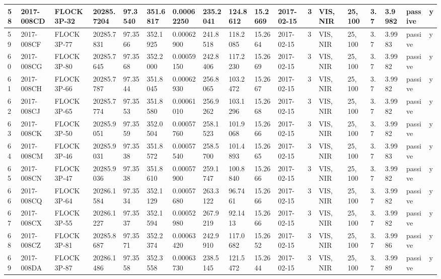 \documentclass[12pt,a4paper,notitlepage,twoside,openright]{report}
\begin{document}
\begin{longtable}{|l|l|l|l|l|l|l|l|l|l|l|l|l|l|l|l|l|l|}
        58 & 2017-008CD & FLOCK 3P-32 & 20285.7204 & 97.3540 & 351.6817 & 0.00062250 & 235.2041 & 124.8612 & 15.2669 & 2017-02-15 & 3 & VIS, NIR & 25, 100 & 3.7 & 3.9982 & passive & y \\ \hline
        59 & 2017-008CF & FLOCK 3P-77 & 20285.7831 & 97.3566 & 352.1925 & 0.00062900 & 241.8518 & 118.2085 & 15.2664 & 2017-02-15 & 3 & VIS, NIR & 25, 100 & 3.7 & 3.9983 & passive & y \\ \hline
        60 & 2017-008CG & FLOCK 3P-80 & 20285.7645 & 97.3568 & 352.2000 & 0.00059150 & 242.8406 & 117.2230 & 15.2669 & 2017-02-15 & 3 & VIS, NIR & 25, 100 & 3.7 & 3.9982 & passive & y \\ \hline
        61 & 2017-008CH & FLOCK 3P-66 & 20285.7787 & 97.3544 & 351.8045 & 0.00062930 & 256.8065 & 103.2472 & 15.2667 & 2017-02-15 & 3 & VIS, NIR & 25, 100 & 3.7 & 3.9982 & passive & y \\ \hline
        62 & 2017-008CJ & FLOCK 3P-65 & 20285.7774 & 97.3553 & 351.8580 & 0.00061010 & 256.9262 & 103.1296 & 15.2668 & 2017-02-15 & 3 & VIS, NIR & 25, 100 & 3.7 & 3.9982 & passive & y \\ \hline
        63 & 2017-008CK & FLOCK 3P-50 & 20285.9051 & 97.3559 & 352.0504 & 0.00057760 & 258.1523 & 101.9068 & 15.2666 & 2017-02-15 & 3 & VIS, NIR & 25, 100 & 3.7 & 3.9982 & passive & y \\ \hline
        64 & 2017-008CM & FLOCK 3P-46 & 20285.9031 & 97.3538 & 351.8572 & 0.00057540 & 258.5700 & 101.4893 & 15.2665 & 2017-02-15 & 3 & VIS, NIR & 25, 100 & 3.7 & 3.9983 & passive & y \\ \hline
        65 & 2017-008CN & FLOCK 3P-47 & 20285.9036 & 97.3538 & 351.8610 & 0.00057900 & 259.1747 & 100.8840 & 15.2666 & 2017-02-15 & 3 & VIS, NIR & 25, 100 & 3.7 & 3.9982 & passive & y \\ \hline
        66 & 2017-008CQ & FLOCK 3P-64 & 20286.1584 & 97.3534 & 352.1129 & 0.00057680 & 263.3122 & 96.7461 & 15.2666 & 2017-02-15 & 3 & VIS, NIR & 25, 100 & 3.7 & 3.9982 & passive & y \\ \hline
        67 & 2017-008CX & FLOCK 3P-55 & 20286.1227 & 97.3537 & 352.1594 & 0.00052980 & 267.9219 & 92.1413 & 15.2666 & 2017-02-15 & 3 & VIS, NIR & 25, 100 & 3.7 & 3.9982 & passive & y \\ \hline
        68 & 2017-008CZ & FLOCK 3P-81 & 20285.8687 & 97.3571 & 352.2374 & 0.00063420 & 242.9910 & 117.0682 & 15.2652 & 2017-02-15 & 3 & VIS, NIR & 25, 100 & 3.7 & 3.9986 & passive & y \\ \hline
        69 & 2017-008DA & FLOCK 3P-87 & 20286.1486 & 97.3558 & 352.3558 & 0.00063730 & 238.5145 & 121.5472 & 15.2644 & 2017-02-15 & 3 & VIS, NIR & 25, 100 & 3.7 & 3.9989 & passive & y \\ \hline

\end{longtable}
\end{document}
